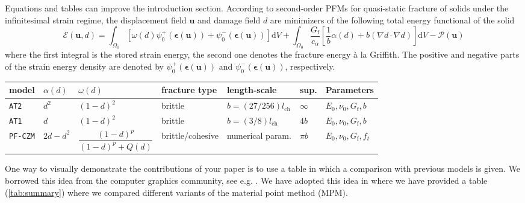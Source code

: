 \documentclass[authoryear,12pta4paper,fleqn]{article}
\newcommand{\bfepsilon}{\boldsymbol{\epsilon}}
\newcommand{\bfu}{\boldsymbol{u}}
\newcommand{\td}{\text{d}}
\numberwithin{equation}{section}
\theoremstyle{remark}
\begin{document}
\begin{MyBox}[label={algo-static-FEM}]
{Equations and tables can improve the introduction section.}
According to second-order PFMs for quasi-static fracture of solids under the infinitesimal strain regime, the displacement field $\bfu$ and damage field $d$ are minimizers of the following total energy functional of the solid 
\begin{equation*}
  \mathscr{E} (\bfu, d) 
    = \int_{\varOmega_{0}} \left[\omega(d)\psi_{0}^+(\bfepsilon (\bfu)) + \psi_{0}^-(\bfepsilon (\bfu)) \right]\td V
    + \int_{\varOmega_{0}}  \frac{G_\text{f}}{c_\alpha} \left[ \frac{1}{b} \alpha(d)
    + b \left( \nabla d \cdot \nabla d \right) \right] \td V
    - \mathscr{P} (\bfu)
\label{eq:3}
\end{equation*}
where the first integral is the stored strain energy, the second one denotes the fracture energy \`a la Griffith. The positive and negative parts of the strain energy density are denoted by $\psi_{0}^+(\bfepsilon (\bfu))$ and $\psi_{0}^-(\bfepsilon (\bfu))$, respectively.\\

 \begin{tabularx}{\textwidth}{lllllll}
   \toprule
 model & $\alpha(d)$ &  $\omega(d)$    & fracture type & length-scale & sup.  & Parameters\\
   \midrule     
  \texttt{AT2} & $d^2$  & $(1 - d)^{2}$  & brittle  & $b=(27/256) l_{\text{ch}}$ & $\infty$ & $E_0,\nu_0,G_\text{f},b$ \\
  \texttt{AT1} & $d$    & $(1 - d)^{2}$ &  brittle  & $b=(3/8) l_{\text{ch}}$ & $4b$  & $E_0,\nu_0,G_\text{f},b$\\
  \texttt{PF-CZM} & $2d-d^2$ & $\dfrac{(1 - d)^p}{(1 - d)^p + Q(d)}$ &  brittle/cohesive  & numerical param. & $\pi b$  & $E_0,\nu_0,G_\text{f},f_t$\\
   \bottomrule
 \end{tabularx}%
\end{MyBox}

One way to visually demonstrate the contributions of your paper is to use a table in which a comparison with previous models is given. We borrowed this idea from the computer graphics community, see e.g. \cite{Stomakhin:TG2013a}. We have adopted this idea in \cite{Vaucorbeil:AAM2019} where we have provided a table (\cref{tab:summary}) where we compared different variants of the material point method (MPM).
\end{document}
